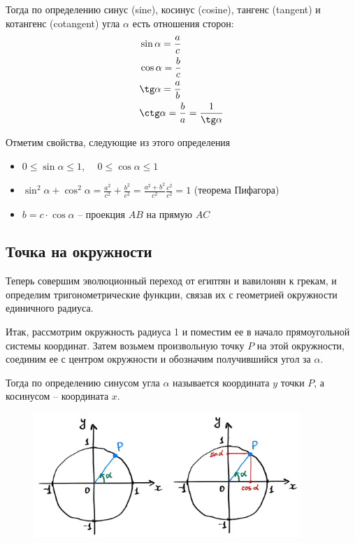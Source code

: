 \documentclass[a4paper,12pt]{article}
\renewcommand{\le}{\leqslant}
\newcounter{z-counter}
\newcounter{th-counter}
\begin{document}
Тогда по определению синус (sine), косинус (cosine), тангенс (tangent) и котангенс (cotangent) угла $\alpha$ есть отношения сторон:
\begin{align*}
    &\sin \alpha = \frac{a}{c}\\
    &\cos \alpha = \frac{b}{c}\\
    &\tg \alpha = \frac{a}{b}\\
    &\ctg \alpha = \frac{b}{a} = \frac{1}{\tg \alpha}
\end{align*}

Отметим свойства, следующие из этого определения
\begin{itemize}
    \item $0 \le \sin \alpha \le 1$, \ \  $0\le \cos \alpha \le 1$
    \item $\sin^2\alpha + \cos^2 \alpha = \frac{a^2}{c^2} + \frac{b^2}{c^2} = \frac{a^2 +b^2}{c^2} \frac{c^2}{c^2}= 1$ (теорема Пифагора)
    \item $b = c \cdot \cos\alpha$ -- проекция $AB$ на прямую $AC$
\end{itemize}

\subsection*{Точка на окружности}
Теперь совершим эволюционный переход от египтян и вавилонян к грекам, и определим тригонометрические функции, связав их с геометрией окружности единичного радиуса.

Итак, рассмотрим окружность радиуса 1 и поместим ее в начало прямоугольной системы координат. Затем возьмем произвольную точку $P$ на этой окружности, соединим ее с центром окружности и обозначим получившийся угол за $\alpha$.

Тогда по определению синусом угла $\alpha$ называется координата $y$ точки $P$, а косинусом -- координата $x$.

\begin{figure}[H]
    \centering
    \includegraphics[width=0.9\textwidth]{pictures/pct_sin_cos_1.jpg}
\end{figure}
\end{document}
